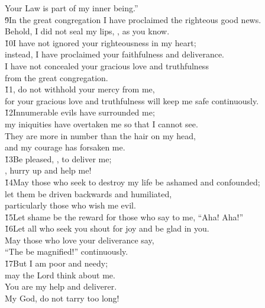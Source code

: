 \begin{poetry}
\poemll    Your Law is part of my inner being.'' \\
\poeml \v{9}In the great congregation I have proclaimed the righteous good news. \\
\poemll    Behold, I did not seal my lips, , as you know. \\
\poeml \v{10}I have not ignored your righteousness in my heart; \\
\poemll    instead, I have proclaimed your faithfulness and deliverance. \\
\poeml I have not concealed your gracious love and truthfulness \\
\poemll    from the great congregation. \\
\poeml \v{11}, do not withhold your mercy from me, \\
\poemll    for your gracious love and truthfulness will keep me safe continuously. \\
\poeml \v{12}Innumerable evils have surrounded me; \\
\poemll    my iniquities have overtaken me so that I cannot see. \\
\poeml They are more in number than the hair on my head, \\
\poemll    and my courage has forsaken me. \\
\poeml \v{13}Be pleased, , to deliver me; \\
\poemll    {}, hurry up and help me! \\
\poeml \v{14}May those who seek to destroy my life be ashamed and confounded; \\
\poemll    let them be driven backwards and humiliated, \\
\poemlll       particularly those who wish me evil. \\
\poeml \v{15}Let shame be the reward for those who say to me, ``Aha! Aha!'' \\
\poeml \v{16}Let all who seek you shout for joy and be glad in you. \\
\poeml May those who love your deliverance say, \\
\poemll    ``The  be magnified!'' continuously. \\
\poeml \v{17}But I am poor and needy; \\
\poemll    may the Lord think about me. \\
\poeml You are my help and deliverer. \\
\poemll    My God, do not tarry too long!
\end{poetry}

